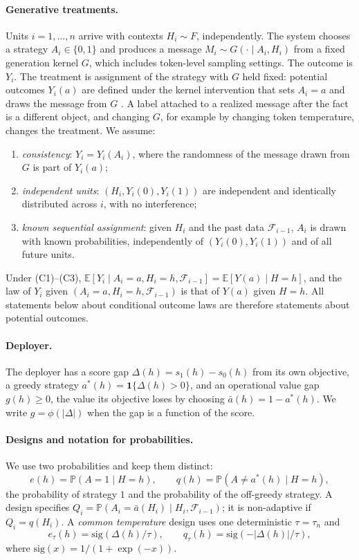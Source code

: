 \documentclass[12pt]{article}
\theoremstyle{definition}
\theoremstyle{remark}
\newcommand{\E}{\mathbb{E}}
\newcommand{\Prob}{\mathbb{P}}
\newcommand{\sgm}{\mathrm{sig}}
\begin{document}
\paragraph{Generative treatments.} Units $i=1,\dots,n$ arrive with contexts
$H_i\sim F$, independently. The system chooses a strategy $A_i\in\{0,1\}$ and
produces a message $M_i\sim G(\cdot\mid A_i,H_i)$ from a fixed generation
kernel $G$, which includes token-level sampling settings. The outcome is
$Y_i$. The treatment is assignment of the strategy with $G$ held fixed:
potential outcomes $Y_i(a)$ are defined under the kernel intervention that
sets $A_i=a$ and draws the message from $G$
\cite{munoz2012population,young2014identification}. A label attached to a
realized message after the fact is a different object, and changing $G$, for
example by changing token temperature, changes the treatment. We assume:
\begin{enumerate}[label=(C\arabic*),leftmargin=3em,itemsep=1pt]
\item \emph{consistency}: $Y_i=Y_i(A_i)$, where the randomness of the message
drawn from $G$ is part of $Y_i(a)$;
\item \emph{independent units}: $(H_i,Y_i(0),Y_i(1))$ are independent and
identically distributed across $i$, with no interference;
\item \emph{known sequential assignment}: given $H_i$ and the past data
$\mathcal F_{i-1}$, $A_i$ is drawn with known probabilities, independently of
$(Y_i(0),Y_i(1))$ and of all future units.
\end{enumerate}
Under (C1)--(C3),
$\E[Y_i\mid A_i=a,H_i=h,\mathcal F_{i-1}]=\E[Y(a)\mid H=h]$, and the law of
$Y_i$ given $(A_i=a,H_i=h,\mathcal F_{i-1})$ is that of $Y(a)$ given $H=h$.
All statements below about conditional outcome laws are therefore statements
about potential outcomes.

\paragraph{Deployer.} The deployer has a score gap $\Delta(h)=s_1(h)-s_0(h)$
from its own objective, a greedy strategy $a^*(h)=\mathbf 1\{\Delta(h)>0\}$,
and an operational value gap $g(h)\ge0$, the value its objective loses by
choosing $\bar a(h)=1-a^*(h)$. We write $g=\phi(|\Delta|)$ when the gap is a
function of the score.

\paragraph{Designs and notation for probabilities.} We use two probabilities
and keep them distinct:
\[
e(h)=\Prob(A=1\mid H=h),\qquad q(h)=\Prob(A\neq a^*(h)\mid H=h),
\]
the probability of strategy $1$ and the probability of the off-greedy
strategy. A design specifies $Q_i=\Prob(A_i=\bar a(H_i)\mid H_i,\mathcal
F_{i-1})$; it is non-adaptive if $Q_i=q(H_i)$. A \emph{common temperature}
design uses one deterministic $\tau=\tau_n$ and
\[
e_\tau(h)=\sgm(\Delta(h)/\tau),\qquad q_\tau(h)=\sgm(-|\Delta(h)|/\tau),
\]
where $\sgm(x)=1/(1+\exp(-x))$.
\end{document}
